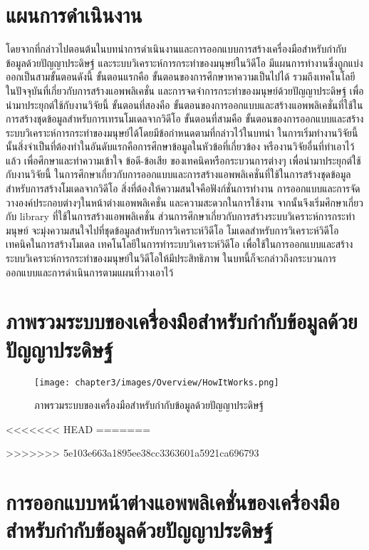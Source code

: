 \section{แผนการดำเนินงาน}
โดยจากที่กล่าวไปตอนต้นในบทนำการดำเนินงานและการออกแบบการสร้างเครื่องมือสำหรับกำกับข้อมูลด้วยปัญญาประดิษฐ์
และระบบวิเคราะห์การกระทำของมนุษย์ในวิดีโอ มีแผนการทำงานซึ่งถูกแบ่งออกเป็นสามขั้นตอนดังนี้ 
ขั้นตอนแรกคือ ขั้นตอนของการศึกษาหาความเป็นไปได้ รวมถึงเทคโนโลยีในปัจจุบันที่เกี่ยวกับการสร้างแอพพลิเคชั่น และการจดจำการกระทำของมนุษย์ด้วยปัญญาประดิษฐ์ เพื่อนำมาประยุกต์ใช้กับงานวิจัยนี้
ขั้นตอนที่สองคือ ขั้นตอนของการออกแบบและสร้างแอพพลิเคชั่นที่ใช้ในการสร้างชุดข้อมูลสำหรับการเทรนโมเดลจากวิดีโอ
ขั้นตอนที่สามคือ ขั้นตอนของการออกแบบและสร้างระบบวิเคราะห์การกระทำของมนุษย์ได้โดยมีข้อกำหนดตามที่กล่าวไว้ในบทนำ
ในการเริ่มทำงานวิจัยนี้นั้นสิ่งจำเป็นที่ต้องทำในอันดับแรกคือการศึกษาข้อมูลในหัวข้อที่เกี่ยวข้อง หรืองานวิจัยอื่นที่ทำเอาไว้แล้ว
เพื่อศึกษาและทำความเข้าใจ ข้อดี-ข้อเสีย ของเทคนิคหรือกระบวนการต่างๆ เพื่อนำมาประยุกต์ใช้กับงานวิจัยนี้
ในการศึกษาเกี่ยวกับการออกแบบและการสร้างแอพพลิเคชั่นที่ใช้ในการสร้างชุดข้อมูลสำหรับการสร้างโมเดลจากวิดีโอ 
สิ่งที่ต้องให้ความสนใจคือฟังก์ชั่นการทำงาน การออกแบบและการจัดวางองค์ประกอบต่างๆในหน้าต่างแอพพลิเคชั่น
และความสะดวกในการใช้งาน จากนั้นจึงเริ่มศึกษาเกี่ยวกับ library ที่ใช้ในการสร้างแอพพลิเคชั่น
ส่วนการศึกษาเกี่ยวกับการสร้างระบบวิเคราะห์การกระทำมนุษย์ จะมุ่งความสนใจไปที่ชุดข้อมูลสำหรับการวิเคราะห์วิดีโอ
โมเดลสำหรับการวิเคราะห์วิดีโอ เทคนิคในการสร้างโมเดล เทคโนโลยีในการทำระบบวิเคราะห์วิดีโอ
เพื่อใช้ในการออกแบบและสร้างระบบวิเคราะห์การกระทำของมนุษย์ในวิดีโอให้มีประสิทธิภาพ
ในบทนี้ก็จะกล่าวถึงกระบวนการออกแบบและการดำเนินการตามแผนที่วางเอาไว้

\clearpage
\section{ภาพรวมระบบของเครื่องมือสำหรับกำกับข้อมูลด้วยปัญญาประดิษฐ์}
\begin{figure}[!ht]
    \centering
    \texttt{[image: chapter3/images/Overview/HowItWorks.png]}
    \caption{ภาพรวมระบบของเครื่องมือสำหรับกำกับข้อมูลด้วยปัญญาประดิษฐ์}
    \label{fig:labeling_overview}
\end{figure}
<<<<<<< HEAD
=======


>>>>>>> 5e103e663a1895ee38cc3363601a5921ca696793
\clearpage

\section{การออกแบบหน้าต่างแอพพลิเคชั่นของเครื่องมือสำหรับกำกับข้อมูลด้วยปัญญาประดิษฐ์}

\clearpage

